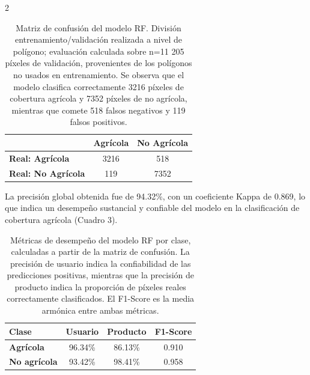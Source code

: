 \begin{multicols}{2}
      \begin{table}[H]
        \centering
        \scriptsize
        \setlength{\tabcolsep}{4pt}
        \renewcommand{\arraystretch}{1.3}
        \begin{tabular}{lcc}
          \hline
          & \textbf{Agrícola} & \textbf{No Agrícola} \\[2pt]
          \hline
          \textbf{Real: Agrícola}    & 3216 & 518    \\
          \textbf{Real: No Agrícola} & 119   & 7352 \\
          \hline
        \end{tabular}
        \caption{Matriz de confusión del modelo RF. División entrenamiento/validación realizada a nivel de polígono; evaluación calculada sobre n=11 205 píxeles de validación, provenientes de los polígonos no usados en entrenamiento. Se observa que el modelo clasifica correctamente 3216 píxeles de cobertura agrícola y 7352 píxeles de no agrícola, mientras que comete 518 falsos negativos y 119 falsos positivos.}
        \label{tab:matriz-confusion}
      \end{table}

      La precisión global obtenida fue de 94.32\%, con un coeficiente Kappa de 0.869, lo que indica un desempeño sustancial y confiable del modelo en la clasificación de cobertura agrícola (Cuadro 3).

      \begin{table}[H]
        \centering
        \scriptsize
        \setlength{\tabcolsep}{4pt}
        \renewcommand{\arraystretch}{1.3}
        \begin{tabular}{lccc}
          \hline
          \textbf{Clase} & \textbf{Usuario} & \textbf{Producto} & \textbf{F1-Score} \\
          \hline
          \textbf{Agrícola}     & 96.34\% & 86.13\% & 0.910 \\
          \textbf{No agrícola}  & 93.42\% & 98.41\% & 0.958 \\
          \hline
        \end{tabular}
        \caption{Métricas de desempeño del modelo RF por clase, calculadas a partir de la matriz de confusión. La precisión de usuario indica la confiabilidad de las predicciones positivas, mientras que la precisión de producto indica la proporción de píxeles reales correctamente clasificados. El F1-Score es la media armónica entre ambas métricas.}
        \label{tab:metricas-desempeño}
      \end{table}


\end{multicols}
